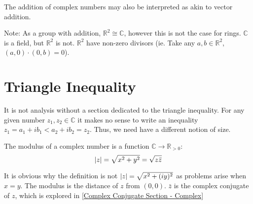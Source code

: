 \documentclass[12pt, english]{book}
\begin{document}
	The addition of complex numbers may also be interpreted as akin to vector addition. 
	\begin{center}
	\end{center}
	Note: As a group with addition, \(\mathbb{R}^2 \cong \mathbb{C}\), however this is not the case for rings. \(\mathbb{C}\) is a field, but \(\mathbb{R}^2\) is not. \(\mathbb{R}^2\) have non-zero divisors (ie. Take any \(a,b \in \mathbb{R}^2\), \((a, 0) \cdot (0, b) = 0\)).
	
	\section{Triangle Inequality} \label{Triangle Inequality Section - Complex}
	It is not analysis without a section dedicated to the triangle inequality. For any given number $z_1, z_2 \in \mathbb{C}$ it makes no sense to write an inequality $z_1 = a_1 + ib_1 <  a_2 + ib_2 = z_2$. Thus, we need have a different notion of size. 
	
	\begin{definition}[Modulus]
		The modulus of a complex number is a function $\mathbb{C} \rightarrow \mathbb{R}_{>0}$:
		$$\abs{z} = \sqrt{x^2 + y^2} = \sqrt{z \bar{z}}$$
	\end{definition}
	It is obvious why the definition is not $\abs{z} = \sqrt{x^2 + (iy)^2}$ as problems arise when $x = y$. The modulus is the distance of $z$ from $(0, 0)$. $\bar{z}$ is the complex conjugate of $z$, which is explored in \cref{Complex Conjugate Section - Complex}
	
\end{document}
